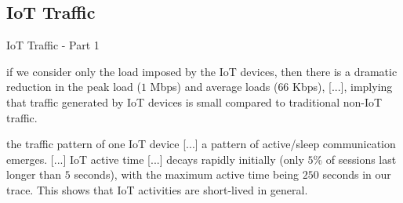 \documentclass[10pt]{beamer}
\begin{document}
\subsection{IoT Traffic}
\begin{frame}{IoT Traffic - Part 1}

\begin{quoting}[font=itshape, begintext={``}, endtext={''\\\textbf{\citet{ITPAReport}}}]
\justifying
[...] if we consider only the load imposed by the IoT devices, then there is a dramatic reduction in the peak load ($1$ Mbps) and average loads ($66$ Kbps), [...], implying that traffic generated by IoT devices is small compared to traditional non-IoT traffic. 
\end{quoting}

\begin{quoting}[font=itshape, begintext={``}, endtext={''\\\textbf{\citet{ITPAReport}}}]
\justifying
the traffic pattern of one IoT device [...] a pattern of active/sleep communication emerges. [...] IoT active time [...] decays rapidly initially (only $5\%$ of sessions last longer than $5$ seconds), with the maximum active time being $250$ seconds in our trace. This shows that IoT activities are short-lived in general. 
\end{quoting}

\end{frame} 
\end{document}
